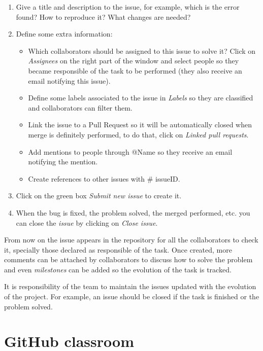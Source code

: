 \begin{enumerate}
\setlength\itemsep{0.0cm}
\item Give a title and description to the issue, for example, which is the error found? How to reproduce it? What changes are needed?
\item Define some extra information:
    \begin{itemize}
        \item Which collaborators should be assigned to this issue to solve it? Click on \textit{Assignees} on the right part of the window and select people so they became responsible of the task to be performed (they also receive an email notifying this issue).
        \item Define some labels associated to the issue in \textit{Labels} so they are classified and collaborators can filter them. 
        \item Link the issue to a Pull Request so it will be automatically closed when merge is definitely performed, to do that, click on \textit{Linked pull requests}.  
        \item Add mentions to people through @Name so they receive an email notifying the mention. 
        \item Create references to other issues with \# issueID.
    \end{itemize}    
\item Click on the green box \textit{Submit new issue} to create it.

\item When the bug is fixed, the problem solved, the merged performed, etc. you can close the \textit{issue} by clicking on \textit{Close issue}. 
\end{enumerate}

From now on the issue appears in the repository for all the collaborators to check it, 
specially those declared as responsible of the task. 
Once created, more comments can be attached by collaborators to discuss how to solve 
the problem and even \textit{milestones} can be added so the evolution of the task is tracked. 

It is responsibility of the team to maintain the issues updated with the evolution of the project. 
For example, an issue should be closed if the task is finished or the problem solved. 




\section{GitHub classroom}

